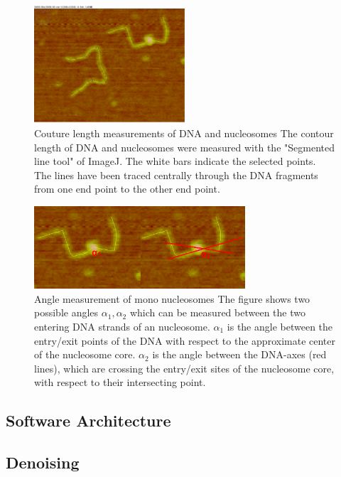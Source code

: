 \documentclass{article}
\begin{document}
\begin{figure}[h!]
\centering
\includegraphics[width = 0.5\textwidth]{coutureLength.png}
\caption{Couture length measurements of DNA and nucleosomes
The contour length of DNA and nucleosomes were measured with the "Segmented line tool" of ImageJ. The white bars indicate the selected points. The lines have been traced centrally through the DNA fragments from one end point to the other end point.}
\label{fig: couture length}
\end{figure}

\begin{figure}[h!]
\centering
\includegraphics[width=0.7\textwidth]{angleMeasurement.png}
\caption{Angle measurement of mono nucleosomes
The figure shows two possible angles $\alpha_1, \alpha_2$ which can be measured between the two entering DNA strands of an nucleosome. $\alpha_1$ is the angle between the entry/exit points of the DNA with respect to the approximate center of the nucleosome core. $\alpha_2$ is the angle between the DNA-axes (red lines), which are crossing the entry/exit sites of the nucleosome core, with respect to their intersecting point.}
\label{fig: angle measurement}
\end{figure}
\newpage
\subsection{Software Architecture}\label{sec:Software Architecture}
\subsection{Denoising}
\end{document}
